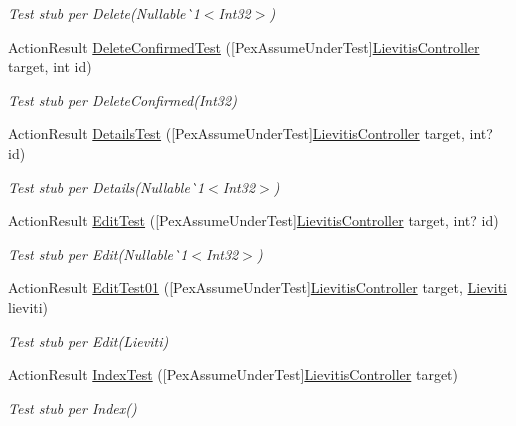 \begin{DoxyCompactItemize}
\begin{DoxyCompactList}\small\item\em Test stub per Delete(Nullable\`{}1$<$Int32$>$)\end{DoxyCompactList}\item 
Action\+Result \mbox{\hyperlink{class_brew_day2_1_1_tests_1_1_lievitis_controller_test_abd0cc71f09e91beb09e5fd64738fb213}{Delete\+Confirmed\+Test}} (\mbox{[}Pex\+Assume\+Under\+Test\mbox{]}\mbox{\hyperlink{class_brew_day2_1_1_controllers_1_1_lievitis_controller}{Lievitis\+Controller}} target, int id)
\begin{DoxyCompactList}\small\item\em Test stub per Delete\+Confirmed(\+Int32)\end{DoxyCompactList}\item 
Action\+Result \mbox{\hyperlink{class_brew_day2_1_1_tests_1_1_lievitis_controller_test_ab49cfb2de9fc1773230c2756d6380c31}{Details\+Test}} (\mbox{[}Pex\+Assume\+Under\+Test\mbox{]}\mbox{\hyperlink{class_brew_day2_1_1_controllers_1_1_lievitis_controller}{Lievitis\+Controller}} target, int? id)
\begin{DoxyCompactList}\small\item\em Test stub per Details(Nullable\`{}1$<$Int32$>$)\end{DoxyCompactList}\item 
Action\+Result \mbox{\hyperlink{class_brew_day2_1_1_tests_1_1_lievitis_controller_test_a0ceca90325bbc8c95d845bdeff5a701f}{Edit\+Test}} (\mbox{[}Pex\+Assume\+Under\+Test\mbox{]}\mbox{\hyperlink{class_brew_day2_1_1_controllers_1_1_lievitis_controller}{Lievitis\+Controller}} target, int? id)
\begin{DoxyCompactList}\small\item\em Test stub per Edit(Nullable\`{}1$<$Int32$>$)\end{DoxyCompactList}\item 
Action\+Result \mbox{\hyperlink{class_brew_day2_1_1_tests_1_1_lievitis_controller_test_a77ecec084bcf2a2b506ff19b622e88b2}{Edit\+Test01}} (\mbox{[}Pex\+Assume\+Under\+Test\mbox{]}\mbox{\hyperlink{class_brew_day2_1_1_controllers_1_1_lievitis_controller}{Lievitis\+Controller}} target, \mbox{\hyperlink{class_brew_day2_1_1_models_1_1_lieviti}{Lieviti}} lieviti)
\begin{DoxyCompactList}\small\item\em Test stub per Edit(\+Lieviti)\end{DoxyCompactList}\item 
Action\+Result \mbox{\hyperlink{class_brew_day2_1_1_tests_1_1_lievitis_controller_test_a43ff1f01da9e7fab9628a6f9aa05a7ad}{Index\+Test}} (\mbox{[}Pex\+Assume\+Under\+Test\mbox{]}\mbox{\hyperlink{class_brew_day2_1_1_controllers_1_1_lievitis_controller}{Lievitis\+Controller}} target)
\begin{DoxyCompactList}\small\item\em Test stub per Index()\end{DoxyCompactList}\end{DoxyCompactItemize}


